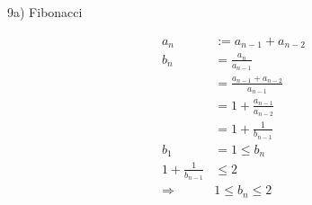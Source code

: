 \documentclass{article}
\begin{document}
    9a) Fibonacci

    \begin{align*}
        a_n &:= a_{n-1} + a_{n-2} \\
        b_n &= \frac{a_n}{a_{n-1}} \\
        &= \frac{a_{n-1} + a_{n-2}}{a_{n-1}}\\
        &= 1 + \frac{a_{n-1}}{a_{n-2}} \\
        &= 1 + \frac1{b_{n-1}} \\
        b_1 &= 1 \leq b_n  \\
        1 + \frac1{b_{n-1}} &\leq 2 \\
        \Rightarrow & 1 \leq b_n \leq 2
    \end{align*}

    \newpage

    
\end{document}

